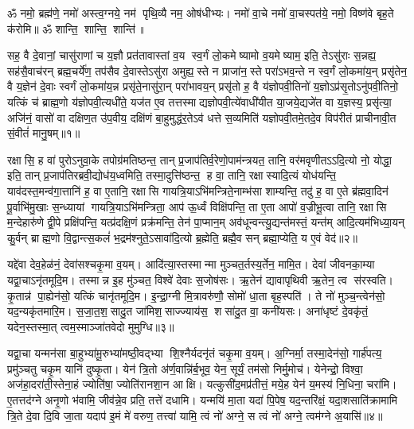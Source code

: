 
\setcounter{anuvakam}{0}
ॐ नमो॒ ब्रह्म॑णे॒ नमो॑ अस्त्व॒ग्नये॒ नम॑ पृथि॒व्यै नम॒ ओष॑धीभ्यः। नमो॑ वा॒चे नमो॑ वा॒चस्पत॑ये॒ नमो॒ विष्ण॑वे बृह॒ते क॑रोमि॥
ॐ शान्ति॒ शान्ति॒ शान्ति॑॥

सह॒ वै दे॒वानां॒ चासु॑राणां च य॒ज्ञौ प्रत॑तावास्तां व॒य स्व॒र्गं लो॒कमेष्यामो व॒यमेष्याम॒ इति॒ तेऽसु॑राः स॒न्नह्य॒ सह॑सै॒वाच॑रन् ब्रह्म॒चर्ये॑ण॒ तप॑सैव दे॒वास्तेऽसु॑रा अमुह्य॒स्ते न प्राजा॑न॒स्ते परा॑ऽभव॒न्ते न स्व॒र्गं लो॒कमा॑य॒न् प्रसृ॑तेन॒ वै य॒ज्ञेन॑ दे॒वाः स्वर्गं लो॒कमा॑य॒न्न प्रसृ॑ते॒नासु॑रा॒न् परा॑भावय॒न् प्रसृ॑तो ह॒ वै य॑ज्ञोपवी॒तिनो॑ य॒ज्ञोऽप्र॑सृ॒तोऽनु॑पवी॒तिनो॒ यत्किं च॑ ब्राह्म॒णो य॑ज्ञोपवी॒त्यधी॑ते॒ यज॑त ए॒व तत्तस्माद्यज्ञोपवी॒त्ये॑वाधी॑यीत या॒जये॒द्यजे॑त वा य॒ज्ञस्य॒ प्रसृ॑त्या॒ अजि॑नं॒ वासो॑ वा दक्षिण॒त उ॑प॒वीय॒ दक्षि॑णं बा॒हुमुद्ध॑र॒तेऽव॑ धत्ते स॒व्यमिति॑ यज्ञोपवी॒तमे॒तदे॒व विप॑रीतं प्राचीनावी॒त सं॒वीतं॑ मानु॒षम्॥१॥\anuvakamend

रक्षासि॒ ह वा॑ पुरोऽनुवा॒के तपोग्र॑मतिष्ठन्त॒ तान् प्र॒जाप॑तिर्व॒रेणो॒पा\-म॑न्त्रयत॒ तानि॒ वर॑मवृणीतऽऽदि॒त्यो नो॒ योद्धा॒ इति॒ तान् प्र॒जाप॑तिरब्रवी॒द्योध॑य॒ध्वमिति॒ तस्मा॒दुत्ति॑ष्ठन्त॒ ह वा॒ तानि॒ रक्षास्यादि॒त्यं योध॑यन्ति॒ याव॑दस्त॒मन्व॑गा॒त्तानि॑ ह॒ वा ए॒तानि॒ रक्षासि गायत्रि॒याऽभि॑मन्त्रिते॒नाम्भ॑सा शाम्यन्ति॒ तदु॑ ह॒ वा ए॒ते ब्र॑ह्मवा॒दिन॑ पू॒र्वाभि॑मु॒खाः स॒न्ध्यायां गायत्रि॒याऽभि॑मन्त्रिता॒ आप॑ ऊ॒र्ध्वं विक्षि॑पन्ति॒ ता ए॒ता आपो॑ व॒ज्रीभू॒त्वा तानि॒ रक्षासि म॒न्देहारु॑णे द्वी॒पे प्रक्षि॑पन्ति॒ यत्प्र॑दक्षि॒णं प्रक्र॑मन्ति॒ तेन॑ पा॒प्मान॒म् अव॑धून्वन्त्यु॒द्यन्त॑मस्तं॒ यन्त॑म् आदि॒त्यम॑भिध्या॒यन् कु॒र्वन् ब्राह्म॒णो वि॒द्वान्त्स॒कलं॑ भ॒द्रम॑श्नुते॒ऽसावा॑दि॒त्यो ब्र॒ह्मेति॒ ब्रह्मै॒व सन् ब्रह्मा॒प्येति॒ य ए॒वं वेद॑॥२॥\anuvakamend

यद्दे॑वा देव॒हेळ॑नं॒ देवा॑सश्चकृ॒मा व॒यम्। आदि॑त्या॒स्तस्मान्मा मुञ्चत॒र्तस्य॒र्तेन॒ मामि॒त। देवा॑ जीवनका॒म्या यद्वा॒चाऽनृ॑तमूदि॒म। तस्मान्न इ॒ह मु॑ञ्चत॒ विश्वे॑ देवाः स॒जोष॑सः। ऋ॒तेन॑ द्यावापृथिवी ऋ॒तेन॒ त्व स॑रस्वति। कृ॒तान्न॑ पा॒ह्येन॑सो॒ यत्किं चानृ॑तमूदि॒म। इ॒न्द्रा॒ग्नी मि॒त्रावरु॑णौ॒ सोमो॑ धा॒ता बृह॒स्पति॑। ते नो॑ मुञ्च॒न्त्वेन॑सो॒ यद॒न्यकृ॑तमारि॒म। स॒जा॒त॒श॒सादु॒त जा॑मिश॒साज्ज्याय॑स॒ शसा॑दु॒त वा॒ कनी॑यसः। अना॑धृष्टं दे॒वकृ॑तं॒ यदेन॒स्तस्मा॒त् त्वम॒स्माञ्जा॑तवेदो मुमुग्धि॥३॥

यद्वा॒चा यन्मन॑सा बा॒हुभ्या॑मू॒रुभ्या॑मष्ठी॒वद्भ्या शि॒श्नैर्यदनृ॑तं चकृ॒मा व॒यम्। अ॒ग्निर्मा॒ तस्मा॒देन॑सो॒ गार्\mbox{}ह॑पत्य॒ प्रमु॑ञ्चतु चकृ॒म यानि॑ दुष्कृ॒ता। येन॑ त्रि॒तो अ॑र्ण॒वान्नि॑र्ब॒भूव॒ येन॒ सूर्यं॒ तम॑सो निर्मु॒मोच॑। येनेन्द्रो॒ विश्वा॒ अज॑हा॒दरा॑ती॒स्तेना॒हं ज्योति॑षा॒ ज्योति॑रानशा॒न आक्षि। यत्कुसी॑द॒मप्र॑तीत्तं॒ मये॒ह येन॑ य॒मस्य॑ नि॒धिना॒ चरा॑मि। ए॒तत्तद॑ग्ने अनृ॒णो भ॑वामि॒ जीव॑न्ने॒व प्रति॒ तत्ते॑ दधामि। यन्मयि॑ मा॒ता यदा॑ पि॒पेष॒ यद॒न्तरि॑क्षं॒ यदा॒शसाति॑क्रामामि त्रि॒ते दे॒वा दि॒वि जा॒ता यदाप॑ इ॒मं मे॑ वरुण॒ तत्त्वा॑ यामि॒ त्वं नो॑ अग्ने॒ स त्वं नो॑ अग्ने॒ त्वम॑ग्ने अ॒यासि॑॥४॥\anuvakamend

